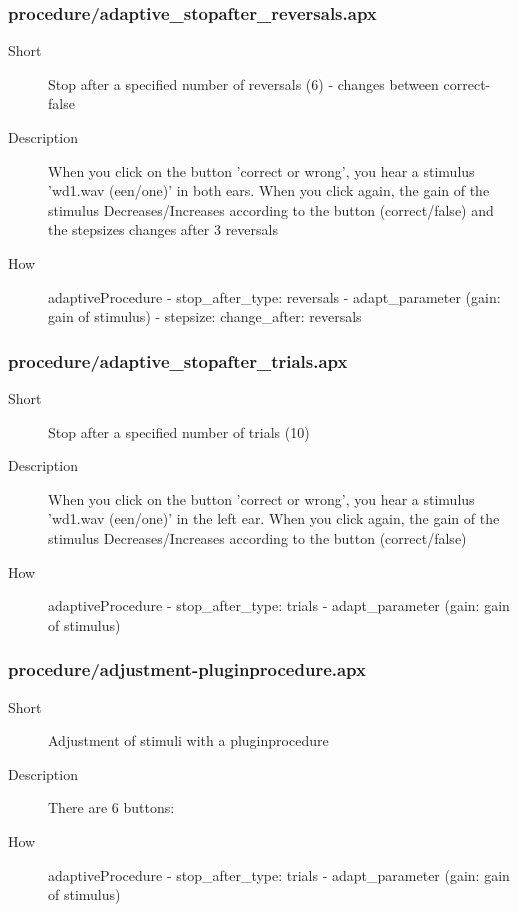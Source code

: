 \subsubsection{procedure/adaptive\_stopafter\_reversals.apx}
\begin{description}
\item[Short] 
 Stop after a specified number of reversals (6) - changes between correct-false
\item[Description] 
 When you click on the button 'correct or wrong', you hear a stimulus 'wd1.wav (een/one)' in both ears. When you click again, the gain of the stimulus Decreases/Increases according to the button (correct/false) and the stepsizes changes after 3 reversals
\item[How] 
 adaptiveProcedure - stop\_after\_type: reversals - adapt\_parameter (gain: gain of stimulus) - stepsize: change\_after: reversals
\end{description}

\subsubsection{procedure/adaptive\_stopafter\_trials.apx}
\begin{description}
\item[Short] 
 Stop after a specified number of trials (10)
\item[Description] 
 When you click on the button 'correct or wrong', you hear a stimulus 'wd1.wav (een/one)' in the left ear. When you click again, the gain of the stimulus Decreases/Increases according to the button (correct/false)
\item[How] 
 adaptiveProcedure - stop\_after\_type: trials - adapt\_parameter (gain: gain of stimulus)
\end{description}

\subsubsection{procedure/adjustment-pluginprocedure.apx}
\begin{description}
\item[Short] 
 Adjustment of stimuli with a pluginprocedure
\item[Description] 
 There are 6 buttons:
\item[How] 
 adaptiveProcedure - stop\_after\_type: trials - adapt\_parameter (gain: gain of stimulus)
\end{description}

